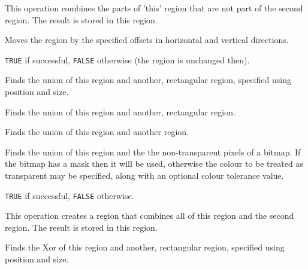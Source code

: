 This operation combines the parts of 'this' region that are not part of the second region.
The result is stored in this region.

\label{wxregionoffset}


Moves the region by the specified offsets in horizontal and vertical
directions.


{\tt TRUE} if successful, {\tt FALSE} otherwise (the region is unchanged then).

\label{wxregionunion}


Finds the union of this region and another, rectangular region, specified using position and size.


Finds the union of this region and another, rectangular region.


Finds the union of this region and another region.


Finds the union of this region and the the non-transparent pixels of a
bitmap.  If the bitmap has a mask then it will be used, otherwise the
colour to be treated as transparent may be specified, along with an
optional colour tolerance value.


{\tt TRUE} if successful, {\tt FALSE} otherwise.


This operation creates a region that combines all of this region and the second region.
The result is stored in this region.

\label{wxregionxor}


Finds the Xor of this region and another, rectangular region, specified using position and size.

